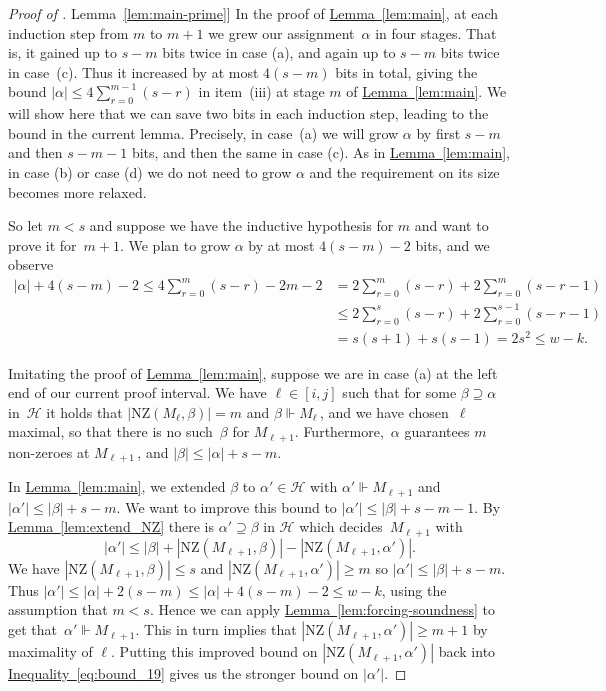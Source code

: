 \documentclass[11pt]{article}
\numberwithin{equation}{section}
\theoremstyle{definition}
\theoremstyle{plain}
\newcommand{\expref}[2]{\hyperref[#2]{#1~\ref{#2}}}
\newcommand{\expeqref}[2]{\hyperref[#2]{#1~\eqref{#2}}}
\newcommand\calH{\mathcal{H}}
\newcommand\rmNZ{\mathrm{NZ}}
\begin{document}
\begin{proof}[Proof of \expref{Lemma}{lem:main-prime}]
In the proof of \expref{Lemma}{lem:main}, at each
induction step from $m$ to $m+1$
we grew our assignment~$\alpha$ in four
stages. That is, it gained 
up to $s-m$ bits twice in case (a), and again  up to
 $s-m$ bits twice in case~(c). Thus it increased by at most $4(s-m)$ bits
in total, giving the bound 
$|\alpha|\le 4 \sum_{r=0}^{m-1}(s-r)$ in item~(iii)
at stage $m$
of \expref{Lemma}{lem:main}.
We will show here that we can save two bits in each induction
step, leading to the bound in the current lemma. 
Precisely, in case~(a) we will grow $\alpha$ by first $s-m$
and then $s-m-1$ bits, and then the same in case (c).
As in \expref{Lemma}{lem:main}, in case (b) or case (d)
we do not need to grow $\alpha$ and
the requirement on its size becomes more relaxed.

So let $m<s$ and suppose we have the inductive hypothesis
for $m$ and want to prove it for~$m+1$. We plan to grow $\alpha$
by at most $4(s-m)-2$ bits, and we observe
\begin{align*} 
|\alpha|+4(s-m)-2 
\le 4 \sum_{r=0}^{m} (s-r) -2m-2
&= 2 \sum_{r=0}^{m} (s-r) + 2 \sum_{r=0}^{m} (s-r -1) \\
&\le 2 \sum_{r=0}^{s} (s-r) + 2 \sum_{r=0}^{s-1} (s-r -1) \\
&= s(s+1) + s(s-1) = 2s^2 \le w-k.
\end{align*}



Imitating the proof of \expref{Lemma}{lem:main},
suppose we are in case (a) at the left end of our current proof interval.
We have  $\ell \in [i,j]$ such that for some $\beta \supseteq \alpha$ in~$\calH$
it holds that $|\rmNZ(M_\ell, \beta)| = m$ and $\beta \Vdash M_\ell$\,,
and we have chosen~$\ell$ maximal, so that there is no such~$\beta$ for $M_{\ell+1}$. 
Furthermore,~$\alpha$ guarantees $m$ non-zeroes at $M_{\ell+1}$\,, 
and $|\beta| \le |\alpha|+s-m$.

In \expref{Lemma}{lem:main}, we extended $\beta$ to $\alpha' \in \calH$
with $\alpha' \Vdash M_{\ell+1}$ and $|\alpha'| \le |\beta|+s-m$. 
We want  to improve this bound to $|\alpha'| \le |\beta|+s-m-1$.
By \expref{Lemma}{lem:extend_NZ} there is $\alpha' \supseteq \beta$ in $\calH$
which decides~$M_{\ell+1}$
with 
\begin{equation} \label{eq:bound_19} \tag{$\star$}
|\alpha'| \le |\beta|+|\rmNZ(M_{\ell+1},\beta)|-|\rmNZ(M_{\ell+1}, \alpha')|.
\end{equation}
We have $|\rmNZ(M_{\ell+1}, \beta)| \le s$ and
$|\rmNZ(M_{\ell+1}, \alpha')| \ge m$ so $|\alpha'| \le |\beta|+s-m$.
Thus $|\alpha'| \le |\alpha|+2(s-m) \le |\alpha|+4(s-m)-2 \le w-k$, using the assumption that $m<s$. Hence we can apply \expref{Lemma}{lem:forcing-soundness}
to get that~$\alpha' \Vdash M_{\ell+1}$.
This in turn implies that $|\rmNZ(M_{\ell+1}, \alpha')| \ge m+1$ by 
maximality of $\ell$.
Putting this improved bound on $|\rmNZ(M_{\ell+1}, \alpha')|$ 
back into %
%
%
\expeqref{Inequality}{eq:bound_19} %
gives us the stronger bound on $|\alpha'|$.


\end{proof}
\end{document}
